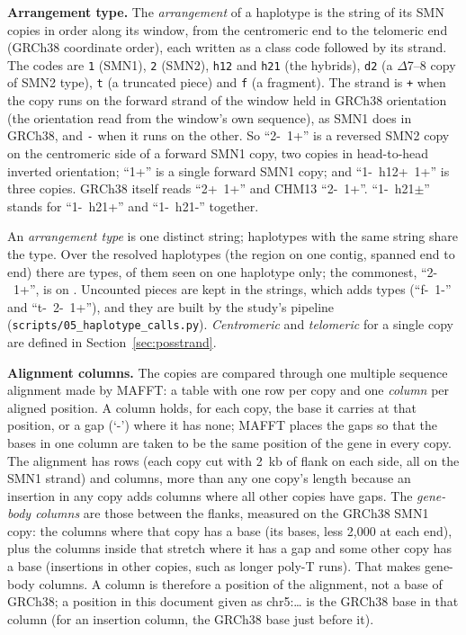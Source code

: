 \textbf{Arrangement type.} The \emph{arrangement} of a haplotype is the string of its SMN copies in order along its
window, from the centromeric end to the telomeric end (GRCh38 coordinate order), each written as a class code followed
by its strand. The codes are \texttt{1} (SMN1), \texttt{2} (SMN2), \texttt{h12} and \texttt{h21} (the hybrids),
\texttt{d2} (a $\Delta$7--8 copy of SMN2 type), \texttt{t} (a truncated piece) and \texttt{f} (a fragment). The
strand is \texttt{+} when the copy runs on the forward strand of the window held in GRCh38 orientation (the
orientation read from the window's own sequence), as SMN1 does in GRCh38, and \texttt{-} when it runs on the other.
So ``2-~1+'' is a reversed SMN2 copy on the centromeric side of a forward SMN1 copy, two copies in head-to-head
inverted orientation; ``1+'' is a single forward SMN1 copy; and ``1-~h12+~1+'' is three copies. GRCh38 itself reads
``2+~1+'' and CHM13 ``2-~1+''. ``1-~h21$\pm$'' stands for ``1-~h21+'' and ``1-~h21-'' together.

An
\emph{arrangement type} is one distinct string; haplotypes with the same string share the type. Over the \arrHaps{}
resolved haplotypes (the region on one contig, spanned end to end) there are \arrTypes{} types, \arrOnce{} of them
seen on one haplotype only; the commonest, ``2-~1+'', is on \arrTopN. Uncounted pieces are kept in the strings, which
adds \arrUncTypes{} types (``f-~1-'' and ``t-~2-~1+''), and they are built by the study's pipeline
(\texttt{scripts/05\_haplotype\_calls.py}). \emph{Centromeric} and \emph{telomeric} for a single copy are defined in
Section~\ref{sec:posstrand}.

\textbf{Alignment columns.} The copies are compared through one multiple sequence alignment made by MAFFT: a table
with one row per copy and one \emph{column} per aligned position. A column holds, for each copy, the base it carries
at that position, or a gap (`-') where it has none; MAFFT places the gaps so that the bases in one column are taken
to be the same position of the gene in every copy. The alignment has \nAlnRows{} rows (each copy cut with 2~kb of flank on each
side, all on the SMN1 strand) and \nAlnCols{} columns, more than any one copy's length because an insertion in any
copy adds columns where all other copies have gaps. The \emph{gene-body columns} are those between the flanks,
measured on the GRCh38 SMN1 copy: the \nRefBody{} columns where that copy has a base (its \nRefLen{} bases, less
2{,}000 at each end), plus the \nInsCols{} columns inside that stretch where it has a gap and some other copy has a
base (insertions in other copies, such as longer poly-T runs). That makes \nGeneCols{} gene-body columns. A column is
therefore a position of the alignment, not a base of GRCh38; a position in this document given as chr5:\ldots{} is
the GRCh38 base in that column (for an insertion column, the GRCh38 base just before it).

